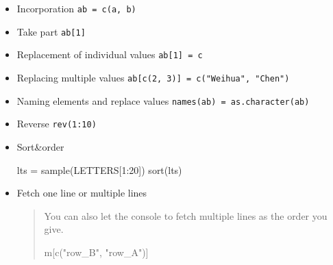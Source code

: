 \documentclass[
]{article}
\newenvironment{Shaded}{}{}
\newcommand{\CommentTok}[1]{\textcolor[rgb]{0.38,0.63,0.69}{\textit{#1}}}
\newcommand{\DecValTok}[1]{\textcolor[rgb]{0.25,0.63,0.44}{#1}}
\newcommand{\FunctionTok}[1]{\textcolor[rgb]{0.02,0.16,0.49}{#1}}
\newcommand{\NormalTok}[1]{#1}
\newcommand{\OtherTok}[1]{\textcolor[rgb]{0.00,0.44,0.13}{#1}}
\newcommand{\SpecialCharTok}[1]{\textcolor[rgb]{0.25,0.44,0.63}{#1}}
\newcommand{\StringTok}[1]{\textcolor[rgb]{0.25,0.44,0.63}{#1}}
\begin{document}
\begin{itemize}
\item
  Incorporation \texttt{ab\ =\ c(a,\ b)}
\item
  Take part \texttt{ab{[}1{]}}
\item
  Replacement of individual values \texttt{ab{[}1{]}\ =\ c}
\item
  Replacing multiple values
  \texttt{ab{[}c(2,\ 3){]}\ =\ c("Weihua",\ "Chen")}
\item
  Naming elements and replace values
  \texttt{names(ab)\ =\ as.character(ab)}
\item
  Reverse \texttt{rev(1:10)}
\item
  Sort\&order

\begin{Shaded}
\begin{Highlighting}[]
\NormalTok{lts }\OtherTok{=} \FunctionTok{sample}\NormalTok{(LETTERS[}\DecValTok{1}\SpecialCharTok{:}\DecValTok{20}\NormalTok{])}
\FunctionTok{sort}\NormalTok{(lts)}
\end{Highlighting}
\end{Shaded}
\item
  Fetch one line or multiple lines

\begin{Shaded}
\end{Shaded}

  \begin{quote}
  You can also let the console to fetch multiple lines as the order you
  give.

\begin{Shaded}
\begin{Highlighting}[]
\NormalTok{m[}\FunctionTok{c}\NormalTok{(}\StringTok{"row\_B"}\NormalTok{, }\StringTok{"row\_A"}\NormalTok{)]}
\end{Highlighting}
\end{Shaded}


\end{quote}
\end{itemize}
\end{document}
